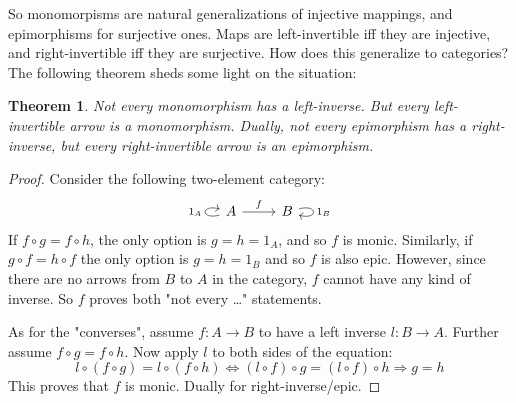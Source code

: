 \documentclass[12pt, a4paper]{article}
\newtheorem{theorem}{Theorem}[section]
\numberwithin{equation}{section}
\begin{document}
So monomorpisms are natural generalizations of injective mappings, and epimorphisms for surjective ones. Maps are left-invertible iff they are injective, and right-invertible iff they are surjective. How does this generalize to categories? The following theorem sheds some light on the situation:
\begin{theorem}
Not every monomorphism has a left-inverse. But every left-invertible arrow is a monomorphism. Dually, not every epimorphism has a right-inverse, but every right-invertible arrow is an epimorphism.
\end{theorem}
\begin{proof}
Consider the following two-element category:
\begin{equation*}
\begin{tikzcd}
A\arrow[loop left, "1_A"]\arrow[r, "f"] &
B\arrow[loop right, "1_B"]
\end{tikzcd}
\end{equation*}
If $f\circ g=f\circ h$, the only option is $g=h=1_A$, and so $f$ is monic. Similarly, if $g\circ f=h\circ f$ the only option is $g=h=1_B$ and so $f$ is also epic. However, since there are no arrows from $B$ to $A$ in the category, $f$ cannot have any kind of inverse. So $f$ proves both "not every \ldots" statements.

As for the "converses", assume $f:A\rightarrow B$ to have a left inverse $l:B\rightarrow A$. Further assume $f\circ g=f\circ h$. Now apply $l$ to both sides of the equation:
\begin{equation}
l\circ(f\circ g)=l\circ(f\circ h)\Leftrightarrow(l\circ f)\circ g=(l\circ f)\circ h\Rightarrow g=h
\end{equation}
This proves that $f$ is monic. Dually for right-inverse/epic.
\end{proof}
\end{document}
